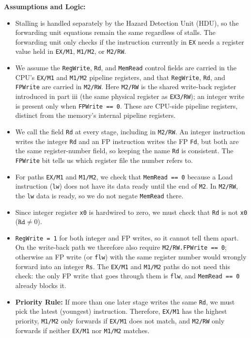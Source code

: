 \documentclass[11pt, a4paper]{article}
\begin{document}
\textbf{Assumptions and Logic:}
\begin{itemize}[noitemsep, topsep=2pt]
    \item Stalling is handled separately by the Hazard Detection Unit (HDU), so the forwarding unit equations remain the same regardless of stalls. The forwarding unit only checks if the instruction currently in \texttt{EX} needs a register value held in \texttt{EX/M1}, \texttt{M1/M2}, or \texttt{M2/RW}.
    \item We assume the \texttt{RegWrite}, \texttt{Rd}, and \texttt{MemRead} control fields are carried in the CPU's \texttt{EX/M1} and \texttt{M1/M2} pipeline registers, and that \texttt{RegWrite}, \texttt{Rd}, and \texttt{FPWrite} are carried in \texttt{M2/RW}. Here \texttt{M2/RW} is the shared write-back register introduced in part iii (the same physical register as \texttt{EX3/RW}); an integer write is present only when \texttt{FPWrite == 0}. These are CPU-side pipeline registers, distinct from the memory's internal pipeline registers.
    \item We call the field \texttt{Rd} at every stage, including in \texttt{M2/RW}. An integer instruction writes the integer \texttt{Rd} and an FP instruction writes the FP \texttt{Fd}, but both are the same register-number field, so keeping the name \texttt{Rd} is consistent. The \texttt{FPWrite} bit tells us which register file the number refers to.
    \item For paths \texttt{EX/M1} and \texttt{M1/M2}, we check that \texttt{MemRead == 0} because a Load instruction (\texttt{lw}) does not have its data ready until the end of \texttt{M2}. In \texttt{M2/RW}, the \texttt{lw} data is ready, so we do not negate \texttt{MemRead} there.
    \item Since integer register \texttt{x0} is hardwired to zero, we must check that \texttt{Rd} is not \texttt{x0} ($\texttt{Rd} \neq 0$).
    \item \texttt{RegWrite = 1} for both integer and FP writes, so it cannot tell them apart. On the write-back path we therefore also require \texttt{M2/RW.FPWrite == 0}; otherwise an FP write (or \texttt{flw}) with the same register number would wrongly forward into an integer \texttt{Rs}. The \texttt{EX/M1} and \texttt{M1/M2} paths do not need this check: the only FP write that goes through them is \texttt{flw}, and \texttt{MemRead == 0} already blocks it.
    \item \textbf{Priority Rule:} If more than one later stage writes the same \texttt{Rd}, we must pick the latest (youngest) instruction. Therefore, \texttt{EX/M1} has the highest priority, \texttt{M1/M2} only forwards if \texttt{EX/M1} does not match, and \texttt{M2/RW} only forwards if neither \texttt{EX/M1} nor \texttt{M1/M2} matches.
\end{itemize}
\end{document}
